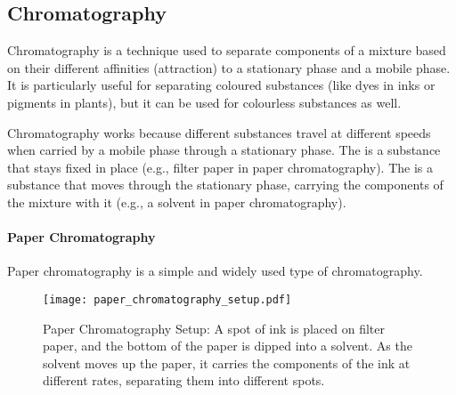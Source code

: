 \subsection{Chromatography}

\begin{keyconcept}{Chromatography}
 is a technique used to separate components of a mixture based on their different affinities (attraction) to a stationary phase and a mobile phase.  It is particularly useful for separating coloured substances (like dyes in inks or pigments in plants), but it can be used for colourless substances as well.
\end{keyconcept}

Chromatography works because different substances travel at different speeds when carried by a mobile phase through a stationary phase. The  is a substance that stays fixed in place (e.g., filter paper in paper chromatography). The  is a substance that moves through the stationary phase, carrying the components of the mixture with it (e.g., a solvent in paper chromatography).


\paragraph{Paper Chromatography}

Paper chromatography is a simple and widely used type of chromatography.

\begin{figure}
\centering
\texttt{[image: paper\_chromatography\_setup.pdf]}
\caption{Paper Chromatography Setup: A spot of ink is placed on filter paper, and the bottom of the paper is dipped into a solvent. As the solvent moves up the paper, it carries the components of the ink at different rates, separating them into different spots.}
\end{figure}


